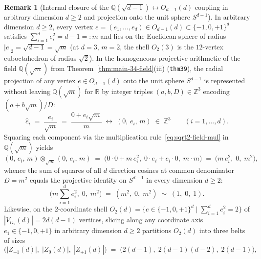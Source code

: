 \documentclass[11pt,a4paper]{article}
\theoremstyle{plain}
\theoremstyle{definition}
\newtheorem{remark}[theorem]{Remark}
\begin{document}
\begin{remark}[Internal closure of the $\mathbb{Q}(\sqrt{d-1}) \leftrightarrow O_{d-1}(d)$ coupling in arbitrary dimension $d \ge 2$ and projection onto the unit sphere $S^{d-1}$]
\label{rem:q-sqrt2-cuboctahedron-closure}
In arbitrary dimension $d \ge 2$, every vertex $e = (e_1, \dots, e_d) \in O_{d-1}(d) \subset \{-1, 0, +1\}^d$ satisfies $\sum_{i=1}^d e_i^2 = d - 1 =: m$ and lies on the Euclidean sphere of radius $|e|_2 = \sqrt{d - 1} = \sqrt{m}$ (at $d = 3$, $m = 2$, the shell $O_2(3)$ is the $12$-vertex cuboctahedron of radius $\sqrt{2}$). In the homogeneous projective arithmetic of the field $\mathbb{Q}(\sqrt{m})$ from Theorem~\ref{thm:main-34-field}(iii) (\texttt{thm39}), the radial projection of any vertex $e \in O_{d-1}(d)$ onto the unit sphere $S^{d-1}$ is represented without leaving $\mathbb{Q}(\sqrt{m})$ for $\mathbb{R}$ by integer triples $(a, b, D) \in \mathbb{Z}^3$ encoding $(a + b\sqrt{m})/D$:
\begin{equation}
  \label{eq:unit-sphere-sqrt2-triple}
  \hat{e}_i \;=\; \frac{e_i}{\sqrt{m}} \;=\; \frac{0 + e_i\sqrt{m}}{m} \;\longleftrightarrow\; (0,\, e_i,\, m) \;\in\; \mathbb{Z}^3
  \qquad (i = 1, \dots, d).
\end{equation}
Squaring each component via the multiplication rule~\eqref{eq:sqrt2-field-mul} in $\mathbb{Q}(\sqrt{m})$ yields
\begin{equation}
  \label{eq:unit-sphere-sqrt2-square}
  (0,\, e_i,\, m) \otimes_{\sqrt{m}} (0,\, e_i,\, m) \;=\; \bigl(0\cdot 0 + m\,e_i^2,\; 0\cdot e_i + e_i\cdot 0,\; m\cdot m\bigr) \;=\; \bigl(m\,e_i^2,\; 0,\; m^2\bigr),
\end{equation}
whence the sum of squares of all $d$ direction cosines at common denominator $D = m^2$ equals the projective identity on $S^{d-1}$ in every dimension $d \ge 2$:
\begin{equation}
  \label{eq:unit-sphere-sqrt2-norm1}
  \biggl(m\sum_{i=1}^{d} e_i^2,\; 0,\; m^2\biggr) \;=\; (m^2,\; 0,\; m^2) \;\sim\; (1,\; 0,\; 1).
\end{equation}
Likewise, on the $2$-coordinate shell $O_2(d) = \{e \in \{-1, 0, +1\}^d \mid \sum_{i=1}^d e_i^2 = 2\}$ of $|V_{O_2}(d)| = 2d(d-1)$ vertices, slicing along any coordinate axis $e_1 \in \{-1, 0, +1\}$ in arbitrary dimension $d \ge 2$ partitions $O_2(d)$ into three belts of sizes
\begin{equation}
  \label{eq:belt-sizes-general-d}
  \bigl(|Z_{-1}(d)|,\; |Z_0(d)|,\; |Z_{+1}(d)|\bigr) \;=\; \bigl(2(d-1),\; 2(d-1)(d-2),\; 2(d-1)\bigr),
\end{equation}

\end{remark}
\end{document}
